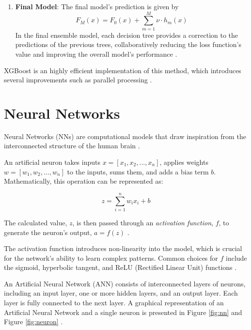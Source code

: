 \begin{enumerate}
    \item \textbf{Final Model}: The final model's prediction is given by
    \begin{equation*}
        F_M(x) = F_0(x) + \sum_{m=1}^{M} \nu \cdot h_m(x)
    \end{equation*}
    In the final ensemble model, each decision tree provides a correction to the predictions of the previous trees, collaboratively reducing the loss function's value and improving the overall model's performance \cite{gb_1}.
\end{enumerate}

XGBoost is an highly efficient implementation of this method, which introduces several improvements such as parallel processing \cite{gb_2}.



\section{Neural Networks}
Neural Networks (NNs) are computational models that draw inspiration from the interconnected structure of the human brain \cite{haykin2009neural}. 

An artificial neuron takes inputs $ x = [x_1, x_2, ..., x_n] $, applies weights $ w = [w_1, w_2, ..., w_n] $ to the inputs, sums them, and adds a bias term $ b $. Mathematically, this operation can be represented as:

\[
z = \sum_{i=1}^{n} w_i x_i + b 
\]

The calculated value, $ z $, is then passed through an \textit{activation function}, $ f $, to generate the neuron's output, $ a = f(z) $ \cite{haykin2009neural}.

The activation function introduces non-linearity into the model, which is crucial for the network's ability to learn complex patterns. Common choices for $ f $ include the sigmoid, hyperbolic tangent, and ReLU (Rectified Linear Unit) functions \cite{goodfellow2016deep}.

An Artificial Neural Network (ANN) consists of interconnected layers of neurons, including an input layer, one or more hidden layers, and an output layer. Each layer is fully connected to the next layer. A graphical representation of an Artificial Neural Network and a single neuron is presented in Figure \ref{fig:nn} and Figure \ref{fig:neuron} \cite{goodfellow2016deep}.

 

